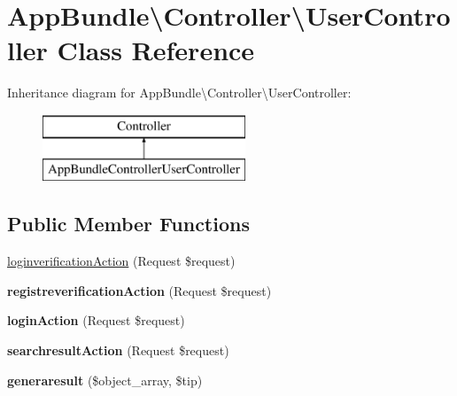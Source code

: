 \hypertarget{class_app_bundle_1_1_controller_1_1_user_controller}{}\section{App\+Bundle\textbackslash{}Controller\textbackslash{}User\+Controller Class Reference}
\label{class_app_bundle_1_1_controller_1_1_user_controller}
Inheritance diagram for App\+Bundle\textbackslash{}Controller\textbackslash{}User\+Controller\+:\begin{figure}[H]
\begin{center}
\leavevmode
\includegraphics[height=2.000000cm]{class_app_bundle_1_1_controller_1_1_user_controller}
\end{center}
\end{figure}
\subsection*{Public Member Functions}
\begin{DoxyCompactItemize}
\item 
\mbox{\hyperlink{class_app_bundle_1_1_controller_1_1_user_controller_a268cbed26597ca6ca90c00b8a2bcd0c9}{loginverification\+Action}} (Request \$request)
\item 
\mbox{\label{class_app_bundle_1_1_controller_1_1_user_controller_ac888ff4055820cfce7a3848b1883b722}} 
{\bfseries registreverification\+Action} (Request \$request)
\item 
\mbox{\label{class_app_bundle_1_1_controller_1_1_user_controller_a0605acce42e82bd54b64833480b0f115}} 
{\bfseries login\+Action} (Request \$request)
\item 
\mbox{\label{class_app_bundle_1_1_controller_1_1_user_controller_a42dd961822df9f7eba01f82b8fd2df30}} 
{\bfseries searchresult\+Action} (Request \$request)
\item 
\mbox{\label{class_app_bundle_1_1_controller_1_1_user_controller_a3f5df2466aaf1e84b63c32a9f4fd524e}} 
{\bfseries generaresult} (\$object\+\_\+array, \$tip)
\end{DoxyCompactItemize}


